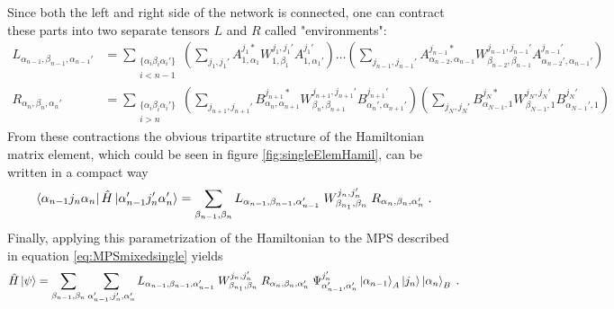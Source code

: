 Since both the left and right side of the network is connected, one can contract these parts into two separate tensors $L$ and $R$ called "environments":
\begin{align}
	L_{\alpha_{n-1}, \beta_{n-1} , \alpha_{n-1} '} &= \sum_{ \substack{ \{ \alpha_i \beta_i \alpha_i ' \} \\ i < n-1}} \left( \sum_{j_1 , j_1 '} A_{1 , \alpha_1}^{j_1 *} W_{1, \beta_1}^{j_1 , j_1 '} A_{1 , \alpha_1 '}^{j_1 '} \right) \ldots \left( \sum_{j_{n-1} , j_{n-1} '} A_{\alpha_{n-2} , \alpha_{n-1}}^{j_{n-1} *} W_{\beta_{n-2}, \beta_{n-1}}^{j_{n-1} , j_{n-1} '} A_{\alpha_{n-2} ' , \alpha_{n-1} '}^{j_{n-1} '} \right) \label{eq:Ltensor} \\
	R_{\alpha_{n} ,\beta_{n} , \alpha_{n} '} &= \sum_{ \substack{ \{ \alpha_i \beta_i \alpha_i ' \} \\ i > n}} \left( \sum_{j_{n+1} , j_{n+1} '} B_{\alpha_n , \alpha_{n+1}}^{j_{n+1} *} W_{\beta_n, \beta_{n+1}}^{j_{n+1} , j_{n+1} '} B_{\alpha_n ', \alpha_{n+1} '}^{j_{n+1} '} \right) \left( \sum_{j_{N} , j_{N} '} B_{\alpha_{N-1} , 1}^{j_{N} *} W_{\beta_{N-1}, 1}^{j_{N} , j_{N} '} B_{\alpha_{N-1}' , 1 }^{j_{N} '} \right) \label{eq:Rtensor}
\end{align}
From these contractions the obvious tripartite structure of the Hamiltonian matrix element, which could be seen in figure \ref{fig:singleElemHamil}, can be written in a compact way
\begin{equation}
	\bra{\alpha_{n-1} j_n \alpha_{n}} \hat{H} \ket{\alpha_{n-1} ' j_n ' \alpha_{n} '} = \sum_{\beta_{n-1} , \beta_{n}} L_{\alpha_{n-1}, \beta_{n-1} , \alpha_{n-1} '} \; W_{\beta_{n_1}, \beta_n}^{j_n , j_n '} \; R_{\alpha_{n} ,\beta_{n} , \alpha_{n} '} \; .
\end{equation}
Finally, applying this parametrization of the Hamiltonian to the MPS described in equation \ref{eq:MPSmixedsingle} yields \cite{Schollwock}
\begin{equation}
	\hat{H} \ket{\psi} = \sum_{\beta_{n-1} , \beta_{n}} \sum_{\alpha_{n-1}' , j_n ', \alpha_{n}'} L_{\alpha_{n-1}, \beta_{n-1} , \alpha_{n-1} '} \; W_{\beta_{n_1}, \beta_n}^{j_n , j_n '} \; R_{\alpha_{n} ,\beta_{n} , \alpha_{n} '} \; \Psi_{\alpha_{n-1} ' , \alpha_{n} '}^{j_n '} \ket{\alpha_{n-1}}_A \ket{j_n} \ket{\alpha_{n}}_B \; .
	\label{eq:HPsi}
\end{equation}

